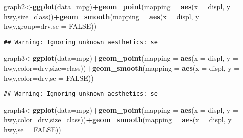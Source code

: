 \documentclass[]{article}
\newenvironment{Shaded}{\begin{snugshade}}{\end{snugshade}}
\newcommand{\KeywordTok}[1]{\textcolor[rgb]{0.13,0.29,0.53}{\textbf{#1}}}
\newcommand{\DataTypeTok}[1]{\textcolor[rgb]{0.13,0.29,0.53}{#1}}
\newcommand{\OtherTok}[1]{\textcolor[rgb]{0.56,0.35,0.01}{#1}}
\newcommand{\OperatorTok}[1]{\textcolor[rgb]{0.81,0.36,0.00}{\textbf{#1}}}
\newcommand{\NormalTok}[1]{#1}
\begin{document}
\begin{Shaded}
\begin{Highlighting}[]
\NormalTok{graph2<-}\KeywordTok{ggplot}\NormalTok{(}\DataTypeTok{data=}\NormalTok{mpg)}\OperatorTok{+}\KeywordTok{geom_point}\NormalTok{(}\DataTypeTok{mapping =} \KeywordTok{aes}\NormalTok{(}\DataTypeTok{x =}\NormalTok{ displ, }\DataTypeTok{y =}\NormalTok{ hwy,}\DataTypeTok{size=}\NormalTok{class))}\OperatorTok{+}\KeywordTok{geom_smooth}\NormalTok{(}\DataTypeTok{mapping =} \KeywordTok{aes}\NormalTok{(}\DataTypeTok{x =}\NormalTok{ displ, }\DataTypeTok{y =}\NormalTok{ hwy,}\DataTypeTok{group=}\NormalTok{drv,}\DataTypeTok{se =} \OtherTok{FALSE}\NormalTok{))}
\end{Highlighting}
\end{Shaded}

\begin{verbatim}
## Warning: Ignoring unknown aesthetics: se
\end{verbatim}

\begin{Shaded}
\begin{Highlighting}[]
\NormalTok{graph3<-}\KeywordTok{ggplot}\NormalTok{(}\DataTypeTok{data=}\NormalTok{mpg)}\OperatorTok{+}\KeywordTok{geom_point}\NormalTok{(}\DataTypeTok{mapping =} \KeywordTok{aes}\NormalTok{(}\DataTypeTok{x =}\NormalTok{ displ, }\DataTypeTok{y =}\NormalTok{ hwy,}\DataTypeTok{color=}\NormalTok{drv,}\DataTypeTok{size=}\NormalTok{class))}\OperatorTok{+}\KeywordTok{geom_smooth}\NormalTok{(}\DataTypeTok{mapping =} \KeywordTok{aes}\NormalTok{(}\DataTypeTok{x =}\NormalTok{ displ, }\DataTypeTok{y =}\NormalTok{ hwy,}\DataTypeTok{color=}\NormalTok{drv,}\DataTypeTok{se =} \OtherTok{FALSE}\NormalTok{))}
\end{Highlighting}
\end{Shaded}

\begin{verbatim}
## Warning: Ignoring unknown aesthetics: se
\end{verbatim}

\begin{Shaded}
\begin{Highlighting}[]
\NormalTok{graph4<-}\KeywordTok{ggplot}\NormalTok{(}\DataTypeTok{data=}\NormalTok{mpg)}\OperatorTok{+}\KeywordTok{geom_point}\NormalTok{(}\DataTypeTok{mapping =} \KeywordTok{aes}\NormalTok{(}\DataTypeTok{x =}\NormalTok{ displ, }\DataTypeTok{y =}\NormalTok{ hwy,}\DataTypeTok{color=}\NormalTok{drv,}\DataTypeTok{size=}\NormalTok{class))}\OperatorTok{+}\KeywordTok{geom_smooth}\NormalTok{(}\DataTypeTok{mapping =} \KeywordTok{aes}\NormalTok{(}\DataTypeTok{x =}\NormalTok{ displ, }\DataTypeTok{y =}\NormalTok{ hwy,}\DataTypeTok{se =} \OtherTok{FALSE}\NormalTok{))}
\end{Highlighting}
\end{Shaded}
\end{document}
